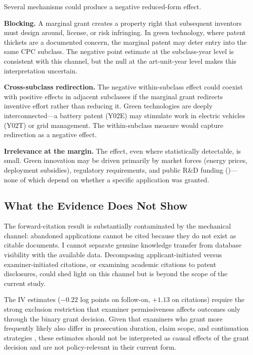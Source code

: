 \documentclass[12pt]{article}
\begin{document}
Several mechanisms could produce a negative reduced-form effect.

\textbf{Blocking.} A marginal grant creates a property right that subsequent inventors must design around, license, or risk infringing. In green technology, where patent thickets are a documented concern, the marginal patent may deter entry into the same CPC subclass. The negative point estimate at the subclass-year level is consistent with this channel, but the null at the art-unit-year level makes this interpretation uncertain.

\textbf{Cross-subclass redirection.} The negative within-subclass effect could coexist with positive effects in adjacent subclasses if the marginal grant redirects inventive effort rather than reducing it. Green technologies are deeply interconnected---a battery patent (Y02E) may stimulate work in electric vehicles (Y02T) or grid management. The within-subclass measure would capture redirection as a negative effect.

\textbf{Irrelevance at the margin.} The effect, even where statistically detectable, is small. Green innovation may be driven primarily by market forces (energy prices, deployment subsidies), regulatory requirements, and public R\&D funding (\citealt{acemoglu2012, popp2002})---none of which depend on whether a specific application was granted.

\subsection{What the Evidence Does Not Show}

The forward-citation result is substantially contaminated by the mechanical channel: abandoned applications cannot be cited because they do not exist as citable documents. I cannot separate genuine knowledge transfer from database visibility with the available data. Decomposing applicant-initiated versus examiner-initiated citations, or examining academic citations to patent disclosures, could shed light on this channel but is beyond the scope of the current study.

The IV estimates ($-0.22$ log points on follow-on, $+1.13$ on citations) require the strong exclusion restriction that examiner permissiveness affects outcomes only through the binary grant decision. Given that examiners who grant more frequently likely also differ in prosecution duration, claim scope, and continuation strategies \citep{frakes2017}, these estimates should not be interpreted as causal effects of the grant decision and are not policy-relevant in their current form.
\end{document}
